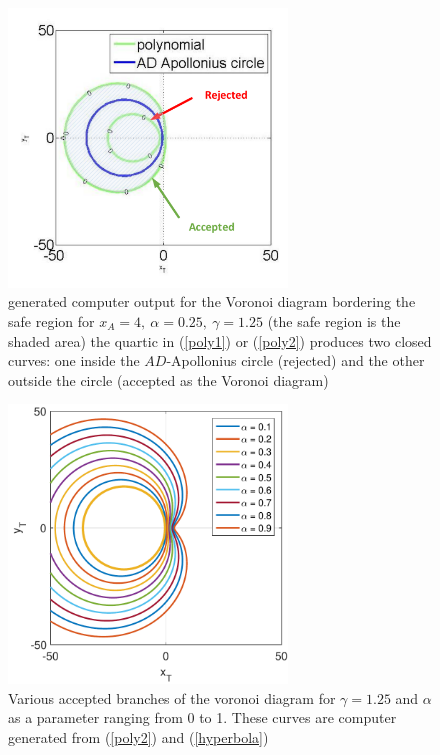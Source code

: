 \begin{figure}[htb]
\centering
\includegraphics[width=0.66\textwidth]{fig/g_1p25.pdf}
\caption{generated computer output for the Voronoi diagram bordering the safe region for $x_A=4,\ \alpha=0.25,\ \gamma=1.25$ (the safe region is the shaded area) the quartic in (\ref{poly1}) or (\ref{poly2}) produces two closed curves: one inside the $AD$-Apollonius circle (rejected) and the other outside the circle (accepted as the Voronoi diagram)}
\label{gamma=1.25}
\end{figure}

\begin{figure}[htb]
\centering
\includegraphics[width=0.66\textwidth]{fig/VAR_alpha_g_1p25.pdf}
\caption{Various accepted branches of the voronoi diagram for $\gamma=1.25$ and $\alpha$ as a parameter ranging from 0 to 1. These curves are computer generated from (\ref{poly2}) and (\ref{hyperbola})}
\label{VAR_alpha_gamma=1.25}
\end{figure}
